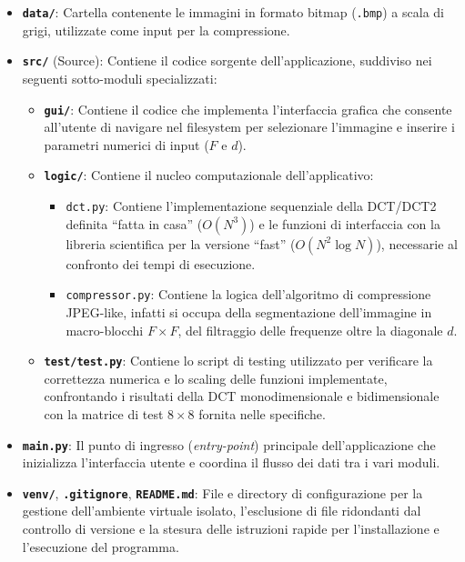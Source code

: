 \documentclass{article}
\begin{document}
\begin{itemize}
	\item \textbf{\texttt{data/}}: Cartella contenente le immagini in formato bitmap (\texttt{.bmp}) a scala di grigi, utilizzate come 
	input per la compressione.
	
	\item \textbf{\texttt{src/}} (Source): Contiene il codice sorgente dell'applicazione, suddiviso nei seguenti sotto-moduli 
	specializzati:
	\begin{itemize}
		\item \textbf{\texttt{gui/}}: Contiene il codice che implementa l'interfaccia grafica che consente all'utente di navigare nel filesystem per selezionare l'immagine e inserire i parametri numerici di input ($F$ e $d$).
		\item \textbf{\texttt{logic/}}: Contiene il nucleo computazionale dell'applicativo:
		\begin{itemize}
			\item \texttt{dct.py}: Contiene l'implementazione sequenziale della DCT/DCT2 definita ``fatta in casa'' ($O(N^3)$) e le funzioni di interfaccia con la libreria scientifica per la versione ``fast'' ($O(N^2 \log N)$), necessarie al confronto dei tempi di esecuzione.
			\item \texttt{compressor.py}: Contiene la logica dell'algoritmo di compressione JPEG-like, infatti si occupa della segmentazione dell'immagine in macro-blocchi $F \times F$, del filtraggio delle frequenze oltre la diagonale $d$.
		\end{itemize}
		\item \textbf{\texttt{test/test.py}}: Contiene lo script di testing utilizzato per verificare la correttezza numerica e 
		lo scaling delle funzioni implementate, confrontando i risultati della DCT monodimensionale e bidimensionale con la matrice di test 
		$8 \times 8$ fornita nelle specifiche.
	\end{itemize}
	
	\item \textbf{\texttt{main.py}}: Il punto di ingresso (\textit{entry-point}) principale dell'applicazione che inizializza l'interfaccia 
	utente e coordina il flusso dei dati tra i vari moduli.
	
	\item \textbf{\texttt{venv/}}, \textbf{\texttt{.gitignore}}, \textbf{\texttt{README.md}}: File e directory di configurazione per la 
	gestione dell'ambiente virtuale isolato, l'esclusione di file ridondanti dal controllo di versione e la stesura delle istruzioni rapide per l'installazione e l'esecuzione del programma.
\end{itemize}
\end{document}
